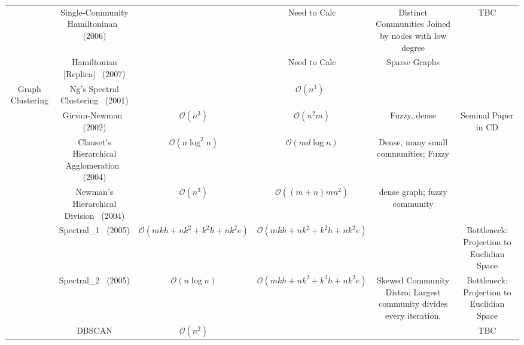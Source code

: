 \begin{landscape}
\begin{table}[t]
\begin{tabular}{|c|c|c|c|c|c|}
                                                  & Single-Community Hamiltoninan~\cite{Reichardt2006} (2006)   & &  Need to Calc    & Distinct Communities Joined by nodes with low degree & TBC \\
                                                  
                                                  & Hamiltonian [Replica]~\cite{Reichardt2007} (2007)    & &  Need to Calc   & Sparse Graphs \\
        \hline
        \multirow{9}{*}{Graph Clustering}         & Ng's Spectral Clustering~\cite{Ng2001} (2001)   & & $\mathcal{O}(n^3)$~\cite{White2005} & & \\
                                                  & Girvan-Newman~\cite{Girvan2002} (2002) & $\mathcal{O}(n^3)$ & $\mathcal{O}(n^2m)$ & Fuzzy, dense & Seminal Paper in CD \\
                                                  
                                                  & Clauset's Hierarchical Agglomeration~\cite{Clauset2004} (2004) & $\mathcal{O}(n\log^2{n})$ & $\mathcal{O}(md\log{n})$ & Dense, many small communities; Fuzzy & \\

                                                  & Newman's Hierarchical Division~\cite{Newman2004a} (2004) & $\mathcal{O}(n^3)$ & $\mathcal{O}((m+n)mn^2)$ & dense graph; fuzzy community & \\
                                                  
                                                  & Spectral\_1~\cite{White2005} (2005)   & $\mathcal{O}(mkh+nk^2+k^2h+nk^2e)$ & $\mathcal{O}(mkh+nk^2+k^2h+nk^2e)$ &  & Bottleneck: Projection to Euclidian Space \\
                                                  
                                                  & Spectral\_2~\cite{White2005} (2005)   & $\mathcal{O}(n\log{n})$        & $\mathcal{O}(mkh+nk^2+k^2h+nk^2e)$ & Skewed Community Distro; Largest community divides every iteration. & Bottleneck: Projection to Euclidian Space\\
                                                  
                                                  & DBSCAN                                & $\mathcal{O}(n^2)$        & & & TBC \\
                                                  

\end{tabular}
\end{table}
\end{landscape}
